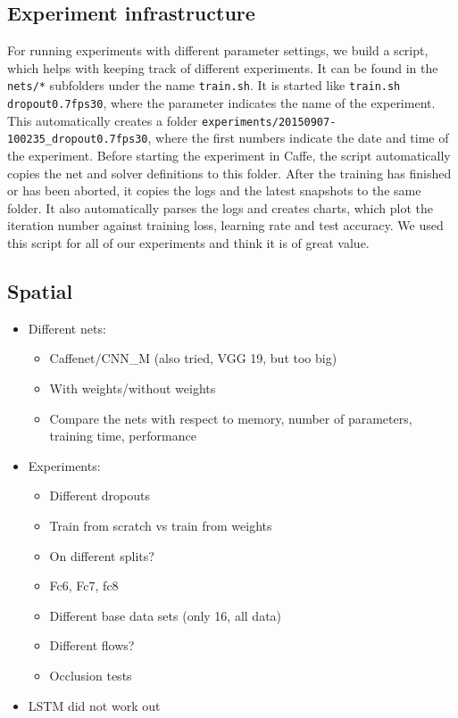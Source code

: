 \subsection{Experiment infrastructure}
For running experiments with different parameter settings, we build a script, which helps with keeping track of different experiments.
It can be found in the \texttt{nets/*} subfolders under the name \texttt{train.sh}.
It is started like \texttt{train.sh dropout0.7fps30}, where the parameter indicates the name of the experiment.
This automatically creates a folder \texttt{experiments/20150907-100235_dropout0.7fps30}, where the first numbers indicate the date and time of the experiment.
Before starting the experiment in Caffe, the script automatically copies the net and solver definitions to this folder.
After the training has finished or has been aborted, it copies the logs and the latest snapshots to the same folder.
It also automatically parses the logs and creates charts, which plot the iteration number against training loss, learning rate and test accuracy.
We used this script for all of our experiments and think it is of great value.

\subsection{Spatial}
\label{subsec:spatial}

\begin{itemize}
	\item
		Different nets:
		\begin{itemize}
			\item Caffenet/CNN\_M (also tried, VGG 19, but too big)
			\item With weights/without weights
			\item Compare the nets with respect to memory, number of parameters, training time, performance
		\end{itemize}
	\item
		Experiments:
		\begin{itemize}
			\item Different dropouts
			\item Train from scratch vs train from weights
			\item On different splits?
			\item Fc6, Fc7, fc8
			\item Different base data sets (only 16, all data)
			\item Different flows?
			\item Occlusion tests
		\end{itemize}
	\item
		LSTM did not work out
\end{itemize}


